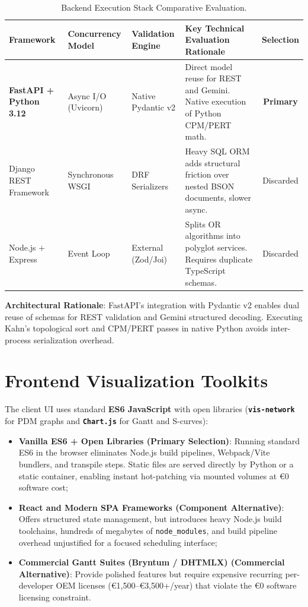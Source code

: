 \begin{table}[H]
\centering
\scriptsize
\setlength{\tabcolsep}{3.0pt}
\renewcommand{\arraystretch}{1.06}
\caption*{Backend Execution Stack Comparative Evaluation.}
\begin{tabularx}{\textwidth}{>{\raggedright\arraybackslash}p{2.8cm} >{\raggedright\arraybackslash}p{2.4cm} >{\raggedright\arraybackslash}p{2.4cm} >{\raggedright\arraybackslash}X c}
\toprule
\textbf{Framework} & \textbf{Concurrency Model} & \textbf{Validation Engine} & \textbf{Key Technical Evaluation Rationale} & \textbf{Selection} \\
\midrule
\textbf{FastAPI + Python 3.12} & Async I/O (Uvicorn) & Native Pydantic v2 & Direct model reuse for REST and Gemini. Native execution of Python CPM/PERT math. & \textbf{Primary} \\
Django REST Framework & Synchronous WSGI & DRF Serializers & Heavy SQL ORM adds structural friction over nested BSON documents, slower async. & Discarded \\
Node.js + Express & Event Loop & External (Zod/Joi) & Splits OR algorithms into polyglot services. Requires duplicate TypeScript schemas. & Discarded \\
\bottomrule
\end{tabularx}
\end{table}

\noindent \textbf{Architectural Rationale}: FastAPI's integration with Pydantic v2 enables dual reuse of schemas for REST validation and Gemini structured decoding. Executing Kahn's topological sort and CPM/PERT passes in native Python avoids inter-process serialization overhead. 

\vspace{4mm}

\section{Frontend Visualization Toolkits}
The client UI uses standard \textbf{ES6 JavaScript} with open libraries (\textbf{\texttt{vis-network}} for PDM graphs and \textbf{\texttt{Chart.js}} for Gantt and S-curves):
\begin{itemize}[itemsep=0.5pt,topsep=1pt,parsep=0pt]
    \item \textbf{Vanilla ES6 + Open Libraries (Primary Selection)}: Running standard ES6 in the browser eliminates Node.js build pipelines, Webpack/Vite bundlers, and transpile steps. Static files are served directly by Python or a static container, enabling instant hot-patching via mounted volumes at €0 software cost;
    \item \textbf{React and Modern SPA Frameworks (Component Alternative)}: Offers structured state management, but introduces heavy Node.js build toolchains, hundreds of megabytes of \texttt{node\_modules}, and build pipeline overhead unjustified for a focused scheduling interface;
    \item \textbf{Commercial Gantt Suites (Bryntum / DHTMLX) (Commercial Alternative)}: Provide polished features but require expensive recurring per-developer OEM licenses (€1,500--€3,500+/year) that violate the €0 software licensing constraint.
\end{itemize}

